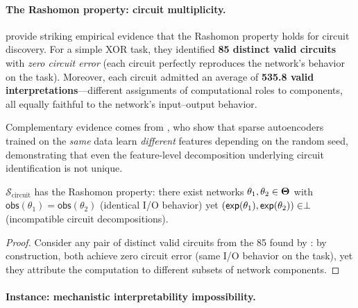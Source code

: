\paragraph{The Rashomon property: circuit multiplicity.}
\citet{meloux2025everything} provide striking empirical evidence that the
Rashomon property holds for circuit discovery.  For a simple XOR task, they
identified \textbf{85 distinct valid circuits} with \emph{zero circuit error}
(each circuit perfectly reproduces the network's behavior on the task).
Moreover, each circuit admitted an average of \textbf{535.8 valid
interpretations}---different assignments of computational roles to
components, all equally faithful to the network's input--output behavior.

Complementary evidence comes from \citet{paulo2025sae}, who show that
sparse autoencoders trained on the \emph{same} data learn \emph{different}
features depending on the random seed, demonstrating that even the
feature-level decomposition underlying circuit identification is not unique.

\begin{proposition}
\label{prop:circuit-rashomon}
$\mathcal{S}_{\mathrm{circuit}}$ has the Rashomon property: there exist
networks $\theta_1, \theta_2 \in \mathbf{\Theta}$ with
$\mathsf{obs}(\theta_1) = \mathsf{obs}(\theta_2)$ (identical I/O behavior)
yet $(\mathsf{exp}(\theta_1), \mathsf{exp}(\theta_2)) \in \perp$
(incompatible circuit decompositions).
\end{proposition}

\begin{proof}
Consider any pair of distinct valid circuits from the 85 found by
\citet{meloux2025everything}: by construction, both achieve zero circuit
error (same I/O behavior on the task), yet they attribute the computation
to different subsets of network components.
\end{proof}

\paragraph{Instance: mechanistic interpretability impossibility.}

